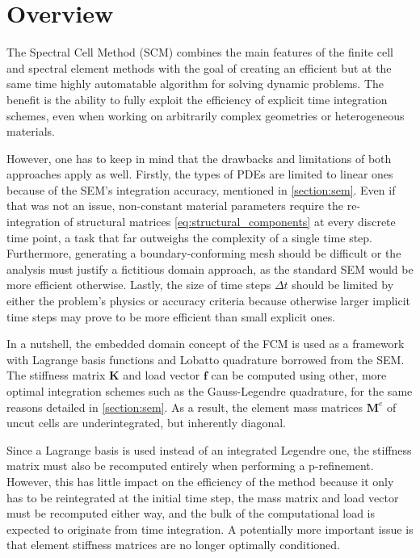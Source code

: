 %
\section{Overview}
\label{section:overview}
%

The Spectral Cell Method (SCM) combines the main features of the finite cell and spectral element methods with the goal of creating an efficient but at the same time highly automatable algorithm for solving dynamic problems. The benefit is the ability to fully exploit the efficiency of explicit time integration schemes, even when working on arbitrarily complex geometries or heterogeneous materials.

However, one has to keep in mind that the drawbacks and limitations of both approaches apply as well. Firstly, the types of PDEs are limited to linear ones because of the SEM's integration accuracy, mentioned in \ref{section:sem}. Even if that was not an issue, non-constant material parameters require the re-integration of structural matrices \ref{eq:structural_components} at every discrete time point, a task that far outweighs the complexity of a single time step. Furthermore, generating a boundary-conforming mesh should be difficult or the analysis must justify a fictitious domain approach, as the standard SEM would be more efficient otherwise. Lastly, the size of time steps $\Delta t$ should be limited by either the problem's physics or accuracy criteria because otherwise larger implicit time steps may prove to be more efficient than small explicit ones.

In a nutshell, the embedded domain concept of the FCM is used as a framework with Lagrange basis functions and Lobatto quadrature borrowed from the SEM. The stiffness matrix $\mathbf K$ and load vector $\mathbf f$ can be computed using other, more optimal integration schemes such as the Gauss-Legendre quadrature, for the same reasons detailed in \ref{section:sem}. As a result, the element mass matrices $\mathbf M^e$ of uncut cells are underintegrated, but inherently diagonal.

Since a Lagrange basis is used instead of an integrated Legendre one, the stiffness matrix must also be recomputed entirely when performing a p-refinement. However, this has little impact on the efficiency of the method because it only has to be reintegrated at the initial time step, the mass matrix and load vector must be recomputed either way, and the bulk of the computational load is expected to originate from time integration. A potentially more important issue is that element stiffness matrices are no longer optimally conditioned.